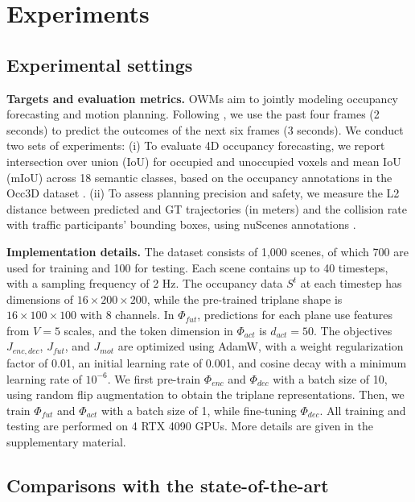\documentclass[11pt,a4paper]{article}
\begin{document}
\section{Experiments}

\subsection{Experimental settings}

\textbf{Targets and evaluation metrics.}
OWMs aim to jointly modeling occupancy forecasting and motion planning.
Following \cite{wenzhaozheng2024,julongwei2024}, we use the past four frames (2 seconds) to predict the outcomes of the next six frames (3 seconds).
We conduct two sets of experiments: (i) To evaluate 4D occupancy forecasting, we report intersection over union (IoU) for occupied and unoccupied voxels and mean IoU (mIoU) across 18 semantic classes, based on the occupancy annotations in the Occ3D dataset \cite{xiaoyutian2023}.
(ii) To assess planning precision and safety, we measure the L2 distance between predicted and GT trajectories (in meters) and the collision rate with traffic participants' bounding boxes, using nuScenes annotations \cite{holgercaesar2020}.

\textbf{Implementation details.}
The dataset consists of 1,000 scenes, of which 700 are used for training and 100 for testing.
Each scene contains up to 40 timesteps, with a sampling frequency of 2 Hz.
The occupancy data $S^t$ at each timestep has dimensions of $16 \times 200 \times 200$, while the pre-trained triplane shape is $16 \times 100 \times 100$ with 8 channels.
In $\Phi_{fut}$, predictions for each plane use features from $V = 5$ scales, and the token dimension in $\Phi_{act}$ is $d_{act} = 50$.
The objectives $J_{enc,dec}$, $J_{fut}$, and $J_{mot}$ are optimized using AdamW, with a weight regularization factor of 0.01, an initial learning rate of 0.001, and cosine decay with a minimum learning rate of $10^{-6}$.
We first pre-train $\Phi_{enc}$ and $\Phi_{dec}$ with a batch size of 10, using random flip augmentation to obtain the triplane representations.
Then, we train $\Phi_{fut}$ and $\Phi_{act}$ with a batch size of 1, while fine-tuning $\Phi_{dec}$.
All training and testing are performed on 4 RTX 4090 GPUs.
More details are given in the supplementary material.

\subsection{Comparisons with the state-of-the-art}
\end{document}
